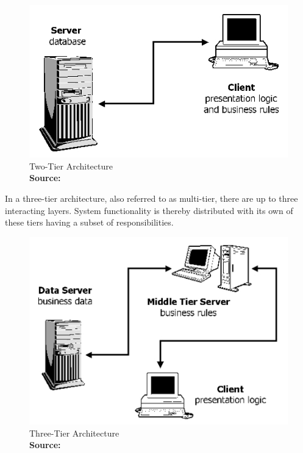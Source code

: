 \begin{figure}[h!]
	\begin{center}
		\includegraphics[scale=0.45]{images/two-tier_architecture.jpg}
	\end{center}
	\caption{
		Two-Tier Architecture
		\\
		\textbf{Source:} \cite{Reference3}
	}
\end{figure}

In a three-tier architecture, also referred to as multi-tier, there are up to three interacting layers. System functionality is thereby distributed with its own of these tiers having a subset of responsibilities.

\begin{figure}[h!]
	\begin{center}
		\includegraphics[scale=0.45]{images/three-tier_architecture.jpg}
	\end{center}
	\caption{
		Three-Tier Architecture
		\\
		\textbf{Source:} \cite{Reference3}
	}
\end{figure}

